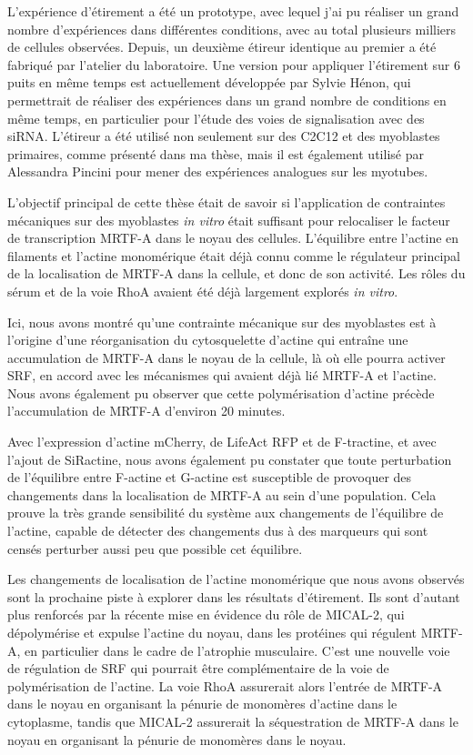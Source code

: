 L'expérience d'étirement a été un prototype, avec lequel j'ai pu réaliser un grand nombre d'expériences dans différentes conditions, avec au total plusieurs milliers de cellules observées. Depuis, un deuxième étireur identique au premier a été fabriqué par l'atelier du laboratoire. Une version pour appliquer l'étirement sur 6 puits en même temps est actuellement développée par Sylvie Hénon, qui permettrait de réaliser des expériences dans un grand nombre de conditions en même temps, en particulier pour l'étude des voies de signalisation avec des siRNA. 
L'étireur a été utilisé non seulement sur des C2C12 et des myoblastes primaires, comme présenté dans ma thèse, mais il est également utilisé par Alessandra Pincini pour mener des expériences analogues sur les myotubes. 

L'objectif principal de cette thèse était de savoir si l'application de contraintes mécaniques sur des myoblastes \textit{in vitro} était suffisant pour relocaliser le facteur de transcription MRTF-A dans le noyau des cellules. L'équilibre entre l'actine en filaments et l'actine monomérique était déjà connu comme le régulateur principal de la localisation de MRTF-A dans la cellule, et donc de son activité. Les rôles du sérum et de la voie RhoA avaient été déjà largement explorés \textit{in vitro}. 

Ici, nous avons montré qu'une contrainte mécanique sur des myoblastes est à l'origine d'une réorganisation du cytosquelette d'actine qui entraîne une accumulation de MRTF-A dans le noyau de la cellule, là où elle pourra activer SRF, en accord avec les mécanismes qui avaient déjà lié MRTF-A et l'actine. 
Nous avons également pu observer que cette polymérisation d'actine précède l'accumulation de MRTF-A d'environ 20 minutes. 

Avec l'expression d'actine mCherry, de LifeAct RFP et de F-tractine, et avec l'ajout de SiRactine, nous avons également pu constater que toute perturbation de l'équilibre entre F-actine et G-actine est susceptible de provoquer des changements dans la localisation de MRTF-A au sein d'une population. Cela prouve la très grande sensibilité du système aux changements de l'équilibre de l'actine, capable de détecter des changements dus à des marqueurs qui sont censés perturber aussi peu que possible cet équilibre. 

Les changements de localisation de l'actine monomérique que nous avons observés sont la prochaine piste à explorer dans les résultats d'étirement. Ils sont d'autant plus renforcés par la récente mise en évidence du rôle de MICAL-2, qui dépolymérise et expulse l'actine du noyau, dans les protéines qui régulent MRTF-A, en particulier dans le cadre de l'atrophie musculaire. C'est une nouvelle voie de régulation de SRF qui pourrait être complémentaire de la voie de polymérisation de l'actine. La voie RhoA assurerait alors l'entrée de MRTF-A dans le noyau en organisant la pénurie de monomères d'actine dans le cytoplasme, tandis que MICAL-2 assurerait la séquestration de MRTF-A dans le noyau en organisant la pénurie de monomères dans le noyau. 

